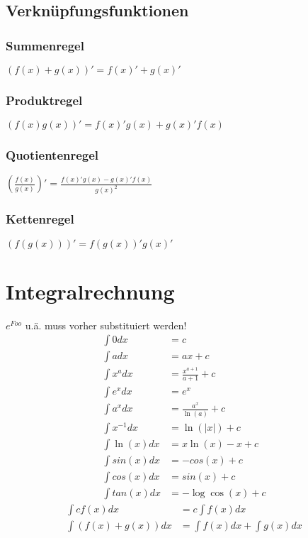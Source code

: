 \documentclass[a4paper, 8pt, landscape]{extarticle}
\let\oldint\int
\renewcommand{\int}{\ensuremath{\textstyle\oldint}}
\begin{document}
\begin{multicols*}{5}
        \subsection{Verknüpfungsfunktionen}
            \subsubsection{Summenregel}
            $(f(x) + g(x))' = f(x)' + g(x)'$  \\
            \subsubsection{Produktregel}
            $(f(x)g(x))' = f(x)'g(x)+g(x)'f(x)$  \\
            \subsubsection{Quotientenregel}
            $(\frac{f(x)}{g(x)})' = \frac{f(x)'g(x)-g(x)'f(x)}{g(x)^2}$ \\
            \subsubsection{Kettenregel}
            $(f(g(x)))' = f(g(x))'g(x)'$ \\
	\section{Integralrechnung}
	    $e^{Foo}$ u.ä. muss vorher substituiert werden!\\
        \begin{align*}
        	\int 0 dx &= c\\
	        \int a dx &= ax+c\\
	        \int x^a dx &= \frac{x^{a+1}}{a+1}+c\\
	        \int e^x dx &= e^x\\
	        \int a^x dx &= \frac{a^x}{\ln(a)}+c\\
	        \int x^{-1} dx &= \ln(|x|)+c\\
	        \int \ln (x) dx &= x\ln(x)-x +c\\
	        \int sin(x) dx &= -cos(x)+c\\
	        \int cos(x) dx &= sin(x)+c\\
	        \int tan(x) dx &= -\log\cos(x)+c
        \end{align*}
        \begin{align*}
        	\int cf(x) dx &= c \int f(x) dx\\
        	\int (f(x) + g(x)) dx &= \int f(x) dx + \int g(x) dx
        \end{align*}

\end{multicols*}
\end{document}
